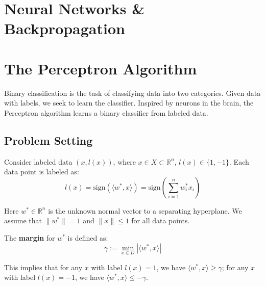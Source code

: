 \documentclass[main.tex]{subfiles}
\begin{document}
\section*{\Huge\textcolor{mantis}{Neural Networks \& Backpropagation}}
\vspace{0.5cm}

\needspace{0.33\textheight}
\section{The Perceptron Algorithm}

Binary classification is the task of classifying data into two categories. Given data with labels, we seek to learn the classifier. Inspired by neurons in the brain, the Perceptron algorithm learns a binary classifier from labeled data.

\subsection{Problem Setting}

Consider labeled data $(x, l(x))$, where $x \in X \subset \mathbb{R}^n$, $l(x) \in \{1, -1\}$. Each data point is labeled as:
$$l(x) = \text{sign}(\langle w^*, x \rangle) = \text{sign}\left(\sum_{i=1}^{n} w_i^* x_i\right)$$

Here $w^* \in \mathbb{R}^n$ is the unknown normal vector to a separating hyperplane. We assume that $\|w^*\| = 1$ and $\|x\| \leq 1$ for all data points.

\begin{definition}[Margin]
The \textbf{margin} for $w^*$ is defined as:
$$\gamma := \min_{x \in D} |\langle w^*, x \rangle|$$
\end{definition}

This implies that for any $x$ with label $l(x) = 1$, we have $\langle w^*, x \rangle \geq \gamma$; for any $x$ with label $l(x) = -1$, we have $\langle w^*, x \rangle \leq -\gamma$.

\end{document}
